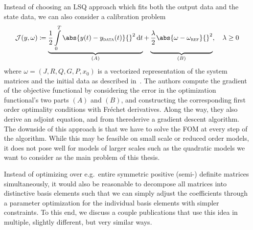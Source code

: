 Instead of choosing an \ac{LSQ} approach which fits both the output data and the state data, we can also consider a calibration problem
\begin{equation}\label{eq:günther-calibration-objective}
    \mcl{J}(y, \omega) \coloneqq \underbrace{\frac{1}{2} \int\limits_0^T \abs{y(t) - y_\msc{data}(t)}{}^2 \dif t}_{(A)} + \underbrace{\vphantom{\int\limits_0^T}\frac{\lambda}{2} \abs{\omega - \omega_\msc{ref}}{}^2}_{(B)}, \quad \lambda \geq 0
\end{equation}
where $\omega = (J, R, Q, G, P, x_0)$ is a vectorized representation of the system matrices and the initial data as described in~\cite{Günther2023}.
The authors compute the gradient of the objective functional by considering the error in the optimization functional's two parts $(A)$ and $(B)$, and constructing the corresponding first order optimality conditions with Fréchet derivatives.
Along the way, they also derive an adjoint equation, and from therederive a gradient descent algorithm.
The downside of this approach is that we have to solve the \ac{FOM} at every step of the algorithm.
While this may be feasible on small scale or reduced order models, it does not pose well for models of larger scales such as the quadratic models we want to consider as the main problem of this thesis.

Instead of optimizing over e.g.\ entire symmetric positive (semi-) definite matrices simultaneously, it would also be reasonable to decompose all matrices into distinctive basis elements such that we can simply adjust the coefficients through a parameter optimization for the individual basis elements with simpler constraints.
To this end, we discuss a couple publications that use this idea in multiple, slightly different, but very similar ways.


